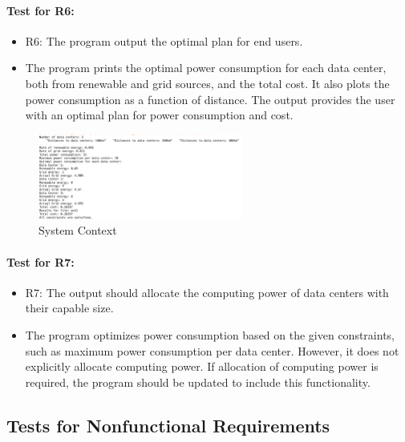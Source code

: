 \documentclass[12pt, titlepage]{article}
\begin{document}
\paragraph{Test for R6:}

\begin{itemize}
    \item R6: The program output the optimal plan for end users.
    \item The program prints the optimal power consumption for each data center, both from renewable and grid sources, and the total cost. It also plots the power consumption as a function of distance. The output provides the user with an optimal plan for power consumption and cost.
\end{itemize}
\begin{figure}[h!]
\begin{center}
\includegraphics[width=0.6\textwidth]{for R6.png}
\caption{System Context}
\label{Fig_Proof for R6} 
\end{center}
\end{figure}


\paragraph{Test for R7:}

\begin{itemize}
    \item R7: The output should allocate the computing power of data centers with their capable size.


    \item The program optimizes power consumption based on the given constraints, such as maximum power consumption per data center. However, it does not explicitly allocate computing power. If allocation of computing power is required, the program should be updated to include this functionality.
\end{itemize}

\subsection{Tests for Nonfunctional Requirements}
\label{nonfunc}
\end{document}
